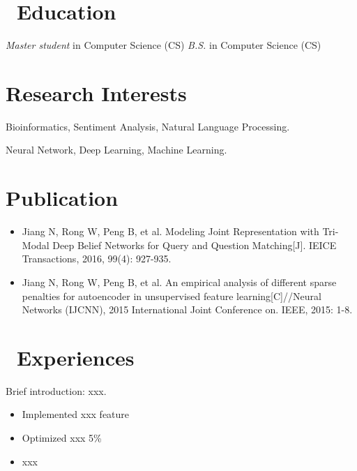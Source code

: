 \documentclass{resume}
\begin{document}



\section{\faGraduationCap\ Education}
\textit{Master student} in Computer Science (CS)
\textit{B.S.} in Computer Science (CS)

\section{Research Interests}
Bioinformatics, Sentiment Analysis, Natural Language Processing.

Neural Network, Deep Learning, Machine Learning.

\section{Publication}
\begin{itemize}[parsep=0.5ex]
\item Jiang N, Rong W, Peng B, et al. Modeling Joint Representation with Tri-Modal Deep Belief Networks for Query and Question Matching[J]. IEICE Transactions, 2016, 99(4): 927-935.

\item Jiang N, Rong W, Peng B, et al. An empirical analysis of different sparse penalties for autoencoder in unsupervised feature learning[C]//Neural Networks (IJCNN), 2015 International Joint Conference on. IEEE, 2015: 1-8.
\end{itemize}
\section{\faUsers\ Experiences}
Brief introduction: xxx.
\begin{itemize}
  \item Implemented xxx feature
  \item Optimized xxx 5\%
  \item xxx
\end{itemize}
\end{document}
